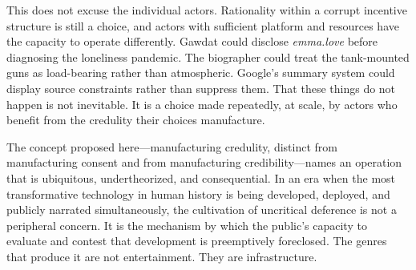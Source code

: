 \documentclass[12pt, a4paper]{article}
\begin{document}
This does not excuse the individual actors. Rationality within a corrupt incentive structure is
still a choice, and actors with sufficient platform and resources have the capacity to operate
differently. Gawdat could disclose \textit{emma.love} before diagnosing the loneliness pandemic.
The biographer could treat the tank-mounted guns as load-bearing rather than atmospheric.
Google's summary system could display source constraints rather than suppress them. That these
things do not happen is not inevitable. It is a choice made repeatedly, at scale, by actors who
benefit from the credulity their choices manufacture.

The concept proposed here---manufacturing credulity, distinct from manufacturing consent and from
manufacturing credibility---names an operation that is ubiquitous, undertheorized, and
consequential. In an era when the most transformative technology in human history is being
developed, deployed, and publicly narrated simultaneously, the cultivation of uncritical deference
is not a peripheral concern. It is the mechanism by which the public's capacity to evaluate and
contest that development is preemptively foreclosed. The genres that produce it are not
entertainment. They are infrastructure.

\newpage
\end{document}

